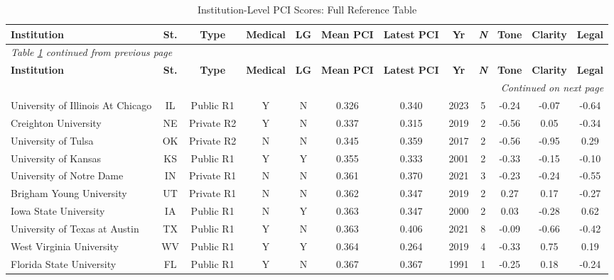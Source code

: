 \small
\setlength{\tabcolsep}{3.8pt}
\renewcommand{\arraystretch}{1.00}
\setlength{\LTcapwidth}{\textwidth}
\setlength{\LTleft}{0pt}
\setlength{\LTright}{0pt}

\begin{longtable}{@{}p{3.55cm}ccccccccccc@{}}
\caption{Institution-Level PCI Scores: Full Reference Table}
\label{tab:inst_pci} \\
\toprule
\textbf{Institution} & \textbf{St.} & \textbf{Type} & \textbf{Medical} & \textbf{LG} & \textbf{Mean PCI} & \textbf{Latest PCI} & \textbf{Yr} & \textbf{\textit{N}} & \textbf{Tone} & \textbf{Clarity} & \textbf{Legal} \\
\midrule
\endfirsthead
\multicolumn{12}{l}{\textit{Table \ref{tab:inst_pci} continued from previous page}} \\
\toprule
\textbf{Institution} & \textbf{St.} & \textbf{Type} & \textbf{Medical} & \textbf{LG} & \textbf{Mean PCI} & \textbf{Latest PCI} & \textbf{Yr} & \textbf{\textit{N}} & \textbf{Tone} & \textbf{Clarity} & \textbf{Legal} \\
\midrule
\endhead
\midrule
\multicolumn{12}{r}{\textit{Continued on next page}} \\
\endfoot
\bottomrule
\endlastfoot
University of Illinois At Chicago & IL & Public R1 & Y & N & 0.326 & 0.340 & 2023 & 5 & -0.24 & -0.07 & -0.64 \\
Creighton University & NE & Private R2 & Y & N & 0.337 & 0.315 & 2019 & 2 & -0.56 & 0.05 & -0.34 \\
University of Tulsa & OK & Private R2 & N & N & 0.345 & 0.359 & 2017 & 2 & -0.56 & -0.95 & 0.29 \\
University of Kansas & KS & Public R1 & Y & Y & 0.355 & 0.333 & 2001 & 2 & -0.33 & -0.15 & -0.10 \\
University of Notre Dame & IN & Private R1 & N & N & 0.361 & 0.370 & 2021 & 3 & -0.23 & -0.24 & -0.55 \\
Brigham Young University & UT & Private R1 & N & N & 0.362 & 0.347 & 2019 & 2 & 0.27 & 0.17 & -0.27 \\
Iowa State University & IA & Public R1 & N & Y & 0.363 & 0.347 & 2000 & 2 & 0.03 & -0.28 & 0.62 \\
University of Texas at Austin & TX & Public R1 & Y & N & 0.363 & 0.406 & 2021 & 8 & -0.09 & -0.66 & -0.42 \\
West Virginia University & WV & Public R1 & Y & Y & 0.364 & 0.264 & 2019 & 4 & -0.33 & 0.75 & 0.19 \\
Florida State University & FL & Public R1 & Y & N & 0.367 & 0.367 & 1991 & 1 & -0.25 & 0.18 & -0.24 \\

\end{longtable}
